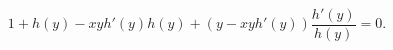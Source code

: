 \begin{equation}
  \label{eq:41}
  1 + h(y) - x y h'(y) h(y) + (y-xyh'(y)) \frac{h'(y)}{h(y)} = 0.
\end{equation}

